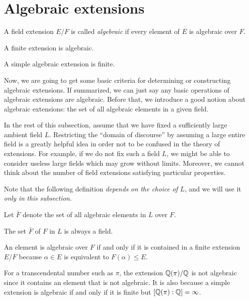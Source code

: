 \documentclass{../note}
\begin{document}
\section{Algebraic extensions}

\begin{prb}
A field extension $E/F$ is called \emph{algebraic} if every element of $E$ is algebraic over $F$.
\begin{parts}
\item A finite extension is algebraic.
\item A simple algebraic extension is finite.
\end{parts}
\end{prb}

Now, we are going to get some basic criteria for determining or constructing algebraic extensions.
If summarized, we can just say any basic operations of algebraic extensions are algebraic.
Before that, we introduce a good notion about algebraic extensions: the set of all algebraic elements in a given field.

In the rest of this subsection, assume that we have fixed a sufficiently large ambient field $L$.
Restricting the ``domain of discourse'' by assuming a large entire field is a greatly helpful idea in order not to be confused in the theory of extensions.
For example, if we do not fix such a field $L$, we might be able to consider useless large fields which may grow without limits.
Moreover, we cannot think about the number of field extensions satisfying particular properties.

Note that the following definition \emph{depends on the choice of $L$}, and we will use it \emph{only in this subsection}.
\begin{defn}
Let $\bar F$ denote the set of all algebraic elements in $L$ over $F$.
\end{defn}
\begin{prop}
The set $\bar F$ of $F$ in $L$ is always a field.
\end{prop}
\begin{pf}
An element is algebraic over $F$ if and only if it is contained in a finite extension $E/F$ because $\alpha\in E$ is equivalent to $F(\alpha)\le E$.

\end{pf}



\begin{ex}
For a transcendental number such as $\pi$, the extension $\mathbb{Q}(\pi)/\mathbb{Q}$ is not algebraic since it contains an element that is not algebraic.
It is also because a simple extension is algebraic if and only if it is finite but $[\mathbb{Q}(\pi):\mathbb{Q}]=\infty$.
\end{ex}
\end{document}
